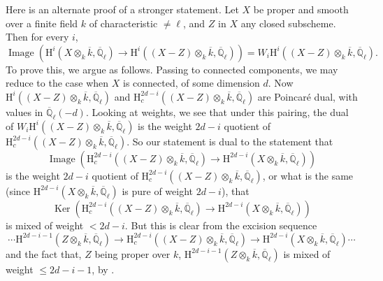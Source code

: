Here is an alternate proof of a stronger statement. Let \(X\) be proper and smooth over a finite field \(k\) of characteristic \(\ne\ell\), and \(Z\) in \(X\) any closed subscheme. Then for every \(i\),
\[
\operatorname{Image}(\mathrm{H}^i(X\otimes_k\overline{k},\overline{\mathbb{Q}}_\ell)\to
\mathrm{H}^i((X-Z)\otimes_k\overline{k},\overline{\mathbb{Q}}_\ell))
=W_i\mathrm{H}^i((X-Z)\otimes_k\overline{k},\overline{\mathbb{Q}}_\ell).
\]
To prove this, we argue as follows. Passing to connected components, we may reduce to the case when \(X\) is connected, of some dimension \(d\). Now \(\mathrm{H}^i((X-Z)\otimes_k\overline{k},\overline{\mathbb{Q}}_\ell)\) and \(\mathrm{H}^{2d-i}_c((X-Z)\otimes_k\overline{k},\overline{\mathbb{Q}}_\ell)\) are Poincaré dual, with values in \(\overline{\mathbb{Q}}_\ell(-d)\). Looking at weights, we see that under this pairing, the dual of \(W_i\mathrm{H}^i((X-Z)\otimes_k\overline{k},\overline{\mathbb{Q}}_\ell)\) is the weight \(2d-i\) quotient of \(\mathrm{H}^{2d-i}_c((X-Z)\otimes_k\overline{k},\overline{\mathbb{Q}}_\ell)\). So our statement is dual to the statement that
\[
\operatorname{Image}(\mathrm{H}^{2d-i}_c((X-Z)\otimes_k\overline{k},\overline{\mathbb{Q}}_\ell)\to
\mathrm{H}^{2d-i}(X\otimes_k\overline{k},\overline{\mathbb{Q}}_\ell))
\]
is the weight \(2d-i\) quotient of \(\mathrm{H}^{2d-i}_c((X-Z)\otimes_k\overline{k},\overline{\mathbb{Q}}_\ell)\), or what is the same (since \(\mathrm{H}^{2d-i}(X\otimes_k\overline{k},\overline{\mathbb{Q}}_\ell)\) is pure of weight \(2d-i\)), that
\[
\operatorname{Ker}(\mathrm{H}^{2d-i}_c((X-Z)\otimes_k\overline{k},\overline{\mathbb{Q}}_\ell)\to
\mathrm{H}^{2d-i}(X\otimes_k\overline{k},\overline{\mathbb{Q}}_\ell))
\]
is mixed of weight \(<2d-i\). But this is clear from the excision sequence
\[
\cdots\mathrm{H}^{2d-i-1}(Z\otimes_k\overline{k},\overline{\mathbb{Q}}_\ell)\to
\mathrm{H}^{2d-i}_c((X-Z)\otimes_k\overline{k},\overline{\mathbb{Q}}_\ell)\to
\mathrm{H}^{2d-i}(X\otimes_k\overline{k},\overline{\mathbb{Q}}_\ell)\cdots
\]
and the fact that, \(Z\) being proper over \(k\), \(\mathrm{H}^{2d-i-1}(Z\otimes_k\overline{k},\overline{\mathbb{Q}}_\ell)\) is mixed of weight \(\leq2d-i-1\), by \cite[3.3.1]{De-WeilII}.

